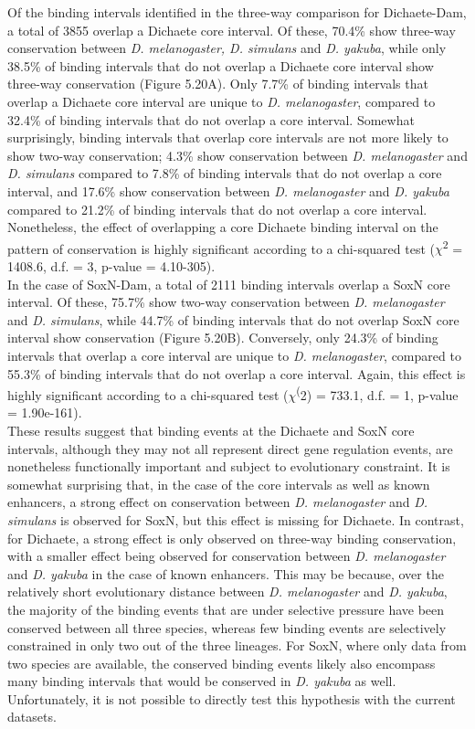 Of the binding intervals identified in the three-way comparison for Dichaete-Dam, a total of 3855 overlap a Dichaete core interval. Of these, 70.4\% show three-way conservation between \emph{D. melanogaster, D. simulans} and \emph{D. yakuba}, while only 38.5\% of binding intervals that do not overlap a Dichaete core interval show three-way conservation (Figure 5.20A). Only 7.7\% of binding intervals that overlap a Dichaete core interval are unique to \emph{D. melanogaster}, compared to 32.4\% of binding intervals that do not overlap a core interval. Somewhat surprisingly, binding intervals that overlap core intervals are not more likely to show two-way conservation; 4.3\% show conservation between \emph{D. melanogaster} and \emph{D. simulans} compared to 7.8\% of binding intervals that do not overlap a core interval, and 17.6\% show conservation between \emph{D. melanogaster} and \emph{D. yakuba} compared to 21.2\% of binding intervals that do not overlap a core interval. Nonetheless, the effect of overlapping a core Dichaete binding interval on the pattern of conservation is highly significant according to a chi-squared test (\(\chi\)\textsuperscript{2} = 1408.6, d.f. = 3, p-value = 4.10-305).\\

In the case of SoxN-Dam, a total of 2111 binding intervals overlap a SoxN core interval. Of these, 75.7\% show two-way conservation between \emph{D. melanogaster} and \emph{D. simulans}, while 44.7\% of binding intervals that do not overlap SoxN core interval show conservation (Figure 5.20B). Conversely, only 24.3\% of binding intervals that overlap a core interval are unique to \emph{D. melanogaster}, compared to 55.3\% of binding intervals that do not overlap a core interval. Again, this effect is highly significant according to a chi-squared test (\(\chi\)\textsuperscript(2) = 733.1, d.f. = 1, p-value = 1.90e-161).\\  

These results suggest that binding events at the Dichaete and SoxN core intervals, although they may not all represent direct gene regulation events, are nonetheless functionally important and subject to evolutionary constraint. It is somewhat surprising that, in the case of the core intervals as well as known enhancers, a strong effect on conservation between \emph{D. melanogaster} and \emph{D. simulans} is observed for SoxN, but this effect is missing for Dichaete. In contrast, for Dichaete, a strong effect is only observed on three-way binding conservation, with a smaller effect being observed for conservation between \emph{D. melanogaster} and \emph{D. yakuba} in the case of known enhancers. This may be because, over the relatively short evolutionary distance between \emph{D. melanogaster} and \emph{D. yakuba}, the majority of the binding events that are under selective pressure have been conserved between all three species, whereas few binding events are selectively constrained in only two out of the three lineages. For SoxN, where only data from two species are available, the conserved binding events likely also encompass many binding intervals that would be conserved in \emph{D. yakuba} as well. Unfortunately, it is not possible to directly test this hypothesis with the current datasets.

